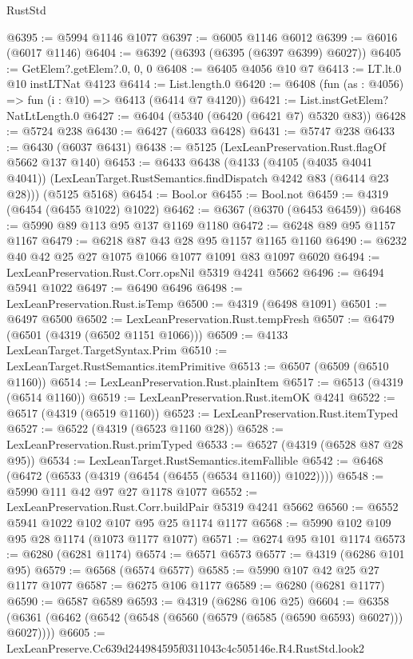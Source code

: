 \begin{lexlean}{RustStd}
\begin{coremodule}
@6395 := @5994 @1146 @1077
@6397 := @6005 @1146 @6012
@6399 := @6016 (@6017 @1146)
@6404 := @6392 (@6393 (@6395 (@6397 @6399) @6027))
@6405 := GetElem?.getElem?.{0, 0, 0}
@6408 := @6405 @4056 @10 @7
@6413 := LT.lt.{0} @10 instLTNat @4123
@6414 := List.length.{0}
@6420 := @6408 (fun (as : @4056) => fun (i : @10) => @6413 (@6414 @7 @4120))
@6421 := List.instGetElem?NatLtLength.{0}
@6427 := @6404 (@5340 (@6420 (@6421 @7) @5320 @83))
@6428 := @5724 @238
@6430 := @6427 (@6033 @6428)
@6431 := @5747 @238
@6433 := @6430 (@6037 @6431)
@6438 := @5125 (LexLeanPreservation.Rust.flagOf @5662 @137 @140)
@6453 := @6433
    @6438
    (@4133
      (@4105 (@4035 @4041 @4041))
      (LexLeanTarget.RustSemantics.findDispatch @4242 @83 (@6414 @23 @28)))
    (@5125 @5168)
@6454 := Bool.or
@6455 := Bool.not
@6459 := @4319 (@6454 (@6455 @1022) @1022)
@6462 := @6367 (@6370 (@6453 @6459))
@6468 := @5990 @89 @113 @95 @137 @1169 @1180
@6472 := @6248 @89 @95 @1157 @1167
@6479 := @6218 @87 @43 @28 @95 @1157 @1165 @1160
@6490 := @6232 @40 @42 @25 @27 @1075 @1066 @1077 @1091 @83 @1097 @6020
@6494 := LexLeanPreservation.Rust.Corr.opsNil @5319 @4241 @5662
@6496 := @6494 @5941 @1022
@6497 := @6490 @6496
@6498 := LexLeanPreservation.Rust.isTemp
@6500 := @4319 (@6498 @1091)
@6501 := @6497 @6500
@6502 := LexLeanPreservation.Rust.tempFresh
@6507 := @6479 (@6501 (@4319 (@6502 @1151 @1066)))
@6509 := @4133 LexLeanTarget.TargetSyntax.Prim
@6510 := LexLeanTarget.RustSemantics.itemPrimitive
@6513 := @6507 (@6509 (@6510 @1160))
@6514 := LexLeanPreservation.Rust.plainItem
@6517 := @6513 (@4319 (@6514 @1160))
@6519 := LexLeanPreservation.Rust.itemOK @4241
@6522 := @6517 (@4319 (@6519 @1160))
@6523 := LexLeanPreservation.Rust.itemTyped
@6527 := @6522 (@4319 (@6523 @1160 @28))
@6528 := LexLeanPreservation.Rust.primTyped
@6533 := @6527 (@4319 (@6528 @87 @28 @95))
@6534 := LexLeanTarget.RustSemantics.itemFallible
@6542 := @6468 (@6472 (@6533 (@4319 (@6454 (@6455 (@6534 @1160)) @1022))))
@6548 := @5990 @111 @42 @97 @27 @1178 @1077
@6552 := LexLeanPreservation.Rust.Corr.buildPair @5319 @4241 @5662
@6560 := @6552 @5941 @1022 @102 @107 @95 @25 @1174 @1177
@6568 := @5990 @102 @109 @95 @28 @1174 (@1073 @1177 @1077)
@6571 := @6274 @95 @101 @1174
@6573 := @6280 (@6281 @1174)
@6574 := @6571 @6573
@6577 := @4319 (@6286 @101 @95)
@6579 := @6568 (@6574 @6577)
@6585 := @5990 @107 @42 @25 @27 @1177 @1077
@6587 := @6275 @106 @1177
@6589 := @6280 (@6281 @1177)
@6590 := @6587 @6589
@6593 := @4319 (@6286 @106 @25)
@6604 := @6358 (@6361 (@6462 (@6542 (@6548 (@6560 (@6579 (@6585 (@6590 @6593) @6027))) @6027))))
@6605 := LexLeanPreserve.Cc639d244984595f0311043c4c505146e.R4.RustStd.look2

\end{coremodule}
\end{lexlean}
